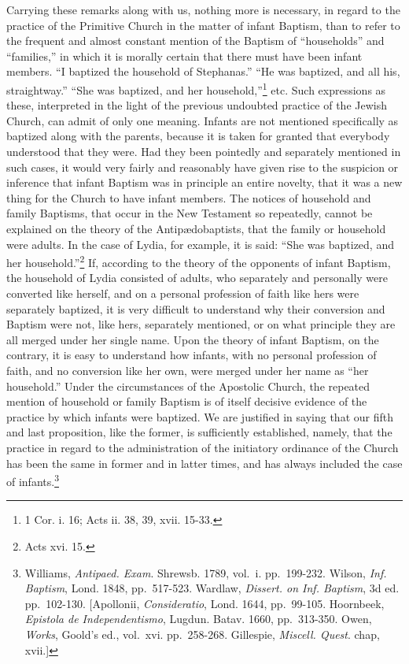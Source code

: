\documentclass[]{book}
\begin{document}
Carrying these remarks along with us, nothing more is necessary, in regard to the practice of the Primitive Church in the matter of infant Baptism, than to refer to the frequent and almost constant mention of the Baptism of ``households'' and ``families,'' in which it is morally certain that there must have been infant members. ``I baptized the household of Stephanas.'' ``He was baptized, and all his, straightway.'' ``She was baptized, and her household,''\footnote{1 Cor. i. 16; Acts ii. 38, 39, xvii. 15-33.} etc. Such expressions as these, interpreted in the light of the previous undoubted practice of the Jewish Church, can admit of only one meaning. Infants are not mentioned specifically as baptized along with the parents, because it is taken for granted that everybody understood that they were. Had they been pointedly and separately mentioned in such cases, it would very fairly and reasonably have given rise to the suspicion or inference that infant Baptism was in principle an entire novelty, that it was a new thing for the Church to have infant members. The notices of household and family Baptisms, that occur in the New Testament so repeatedly, cannot be explained on the theory of the Antipædobaptists, that the family or household were adults. In the case of Lydia, for example, it is said: ``She was baptized, and her household.''\footnote{Acts xvi. 15.} If, according to the theory of the opponents of infant Baptism, the household of Lydia consisted of adults, who separately and personally were converted like herself, and on a personal profession of faith like hers were separately baptized, it is very difficult to understand why their conversion and Baptism were not, like hers, separately mentioned, or on what principle they are all merged under her single name. Upon the theory of infant Baptism, on the contrary, it is easy to understand how infants, with no personal profession of faith, and no conversion like her own, were merged under her name as ``her household.'' Under the circumstances of the Apostolic Church, the repeated mention of household or family Baptism is of itself decisive evidence of the practice by which infants were baptized. We are justified in saying that our fifth and last proposition, like the former, is sufficiently established, namely, that the practice in regard to the administration of the initiatory ordinance of the Church has been the same in former and in latter times, and has always included the case of infants.\footnote{Williams, \emph{Antipaed. Exam}. Shrewsb. 1789, vol.~i. pp.~199-232. Wilson, \emph{Inf. Baptism}, Lond. 1848, pp.~517-523. Wardlaw, \emph{Dissert. on Inf. Baptism}, 3d ed. pp.~102-130. {[}Apollonii, \emph{Consideratio}, Lond. 1644, pp.~99-105. Hoornbeek, \emph{Epistola de Independentismo}, Lugdun. Batav. 1660, pp.~313-350. Owen, \emph{Works}, Goold's ed., vol.~xvi. pp.~258-268. Gillespie, \emph{Miscell. Quest}. chap, xvii.{]}}
\end{document}
